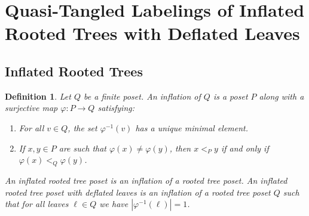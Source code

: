\documentclass[11pt]{amsart}
\newtheorem{Definition}[thm]{Definition}
\newenvironment{definition}
{\begin{Definition}\rm}{\end{Definition}}
\theoremstyle{definition}
\newcommand{\inverse}{^{-1}}
\begin{document}
\section{Quasi-Tangled Labelings of Inflated Rooted Trees with Deflated Leaves}\label{Quasi-Tangled}
\subsection{Inflated Rooted Trees}
\begin{definition}
	Let $ Q $ be a finite poset. An \emph{inflation} of $ Q $ is a poset $ P $ along with a surjective map $ \varphi:P\to Q $ satisfying:\begin{enumerate}
		\item For all $ v\in Q $, the set $ \varphi\inverse(v) $ has a unique minimal element.
		\item If $ x,y\in P $ are such that $ \varphi(x)\neq\varphi(y) $, then $ x<_Py $ if and only if $ \varphi(x)<_Q\varphi(y) $.
	\end{enumerate}
	An \emph{inflated rooted tree poset} is an inflation of a rooted tree poset. An \emph{inflated rooted tree poset with deflated leaves} is an inflation of a rooted tree poset $ Q $ such that for all leaves $ \ell\in Q $ we have $ |\varphi\inverse(\ell)|=1 $. 
\end{definition}
\end{document}
